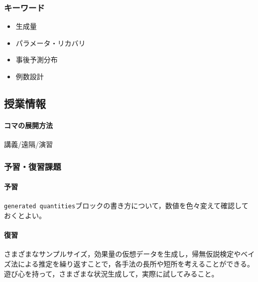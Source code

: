 \subsubsection{キーワード}
\begin{itemize}
	\item 生成量
	\item パラメータ・リカバリ
	\item 事後予測分布
	\item 例数設計
\end{itemize}
\subsection{授業情報}
\paragraph{コマの展開方法}
講義/遠隔/演習
\subsubsection{予習・復習課題}
\paragraph{予習}\verb|generated quantities|ブロックの書き方について，数値を色々変えて確認しておくとよい。
\paragraph{復習}さまざまなサンプルサイズ，効果量の仮想データを生成し，帰無仮説検定やベイズ法による推定を繰り返すことで，各手法の長所や短所を考えることができる。遊び心を持って，さまざまな状況生成して，実際に試してみること。